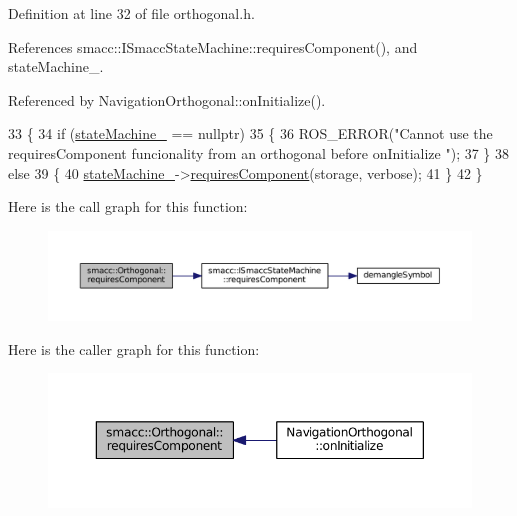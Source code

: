 Definition at line 32 of file orthogonal.\+h.



References smacc\+::\+I\+Smacc\+State\+Machine\+::requires\+Component(), and state\+Machine\+\_\+.



Referenced by Navigation\+Orthogonal\+::on\+Initialize().


\begin{DoxyCode}
33     \{
34         \textcolor{keywordflow}{if} (\hyperlink{classsmacc_1_1Orthogonal_acea2058ac94667e46fc60ed3d4f524f7}{stateMachine\_} == \textcolor{keyword}{nullptr})
35         \{
36             ROS\_ERROR(\textcolor{stringliteral}{"Cannot use the requiresComponent funcionality from an orthogonal before onInitialize
      "});
37         \}
38         \textcolor{keywordflow}{else}
39         \{
40             \hyperlink{classsmacc_1_1Orthogonal_acea2058ac94667e46fc60ed3d4f524f7}{stateMachine\_}->\hyperlink{classsmacc_1_1ISmaccStateMachine_a729d0bcb3c4894e33f0696e0b1aeb155}{requiresComponent}(storage, verbose);
41         \}
42     \}
\end{DoxyCode}


Here is the call graph for this function\+:
\nopagebreak
\begin{figure}[H]
\begin{center}
\leavevmode
\includegraphics[width=350pt]{classsmacc_1_1Orthogonal_a098b5be0f89d0911afc44c10b756ef2a_cgraph}
\end{center}
\end{figure}




Here is the caller graph for this function\+:
\nopagebreak
\begin{figure}[H]
\begin{center}
\leavevmode
\includegraphics[width=350pt]{classsmacc_1_1Orthogonal_a098b5be0f89d0911afc44c10b756ef2a_icgraph}
\end{center}
\end{figure}


